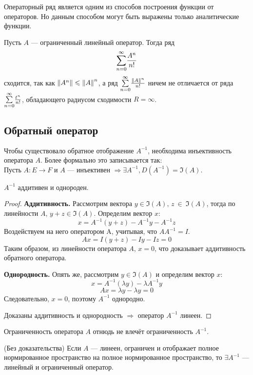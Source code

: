 \documentclass[12pt]{article}
\begin{document}
		Операторный ряд является одним из способов построения функции от операторов. Но данным способом могут быть выражены только 
		аналитические функции.
	
		\example Пусть $A$ --- ограниченный линейный оператор. Тогда ряд 
		$$\underset{n = 0}{\overset{\infty}{\sum}} \frac{A^n}{n!}$$
		сходится, так как $\left\| A^n \right\| \leqslant \left\| A \right\|^n$, а ряд $\underset{n=0}{\overset{\infty}{\sum}} \frac{\left\| A \right\|^n}{n!}$ ничем не отличается от ряда
		$\underset{n=0}{\overset{\infty}{\sum}} \frac{t^n}{n!}$, обладающего радиусом сходимости $R = \infty$.
	
	\subsection{Обратный оператор}
	
		Чтобы существовало обратное отображение $A^{-1}$, необходима инъективность оператора $A$. Более формально это записывается так: \\
		Пусть $A : E \rightarrow F$ и $A$ --- инъективен $\Rightarrow \exists A^{-1}, D(A^{-1}) = \Im(A)$.
	
		\begin{state}
			$A^{-1}$ аддитивен и однороден.
		\end{state}
		\begin{proof}
			\textbf{Аддитивность.} Рассмотрим вектора $y \in \Im(A),\, z~\in~\Im(A)$, тогда по линейности $A$, $y + z \in \Im(A)$.
			Определим вектор $x$:
			$$x = A^{-1}(y + z) - A^{-1} y - A^{-1} z$$
			Воздействуем на него оператором A, учитывая, что $A A^{-1} = I$.
			$$Ax = I(y + z) - I y - I z = 0$$
			Таким образом, из линейности оператора $A$, $x = 0$, что доказывает аддитивность обратного оператора.
		
			\textbf{Однородность.} Опять же, рассмотрим $y \in \Im(A)$ и определим вектор $x$:
			$$ x = A^{-1}(\lambda y) - \lambda A^{-1} y $$
			$$ Ax = \lambda y - \lambda y = 0 $$
			Следовательно, $x = 0$, поэтому $A^{-1}$ однородно.
		
			Доказаны аддитивность и однородность $\Rightarrow$ оператор $A^{-1}$ линеен.
		\end{proof}
	
		Ограниченность оператора $A$ отнюдь не влечёт ограниченность $A^{-1}$.
	
		\begin{theorem}
			(Без доказательства) Если $A$ --- линеен, ограничен и отображает полное нормированное пространство на полное нормированное
			пространство, то $\exists A^{-1}$ --- линейный и ограниченный оператор.
		\end{theorem}
	
\end{document}
